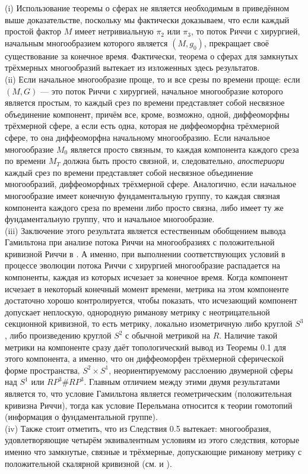 \begin{remark} (i) Использование теоремы о сферах не является необходимым в приведённом 
выше доказательстве, поскольку мы фактически доказываем, что если каждый простой фактор 
$M$ имеет нетривиальную $\pi_{2}$ или $\pi_{3}$, то поток Риччи с хирургией, начальным многообразием 
которого является $(M,g_{0})$, прекращает своё существование за конечное время. Фактически, 
теорема о сферах для замкнутых трёхмерных многообразий вытекает из изложенных здесь результатов.\\
(ii) Если начальное многообразие проще, то и все срезы по времени проще: если $(M,G)$ — это 
поток Риччи с хирургией, начальное многообразие которого является простым, то каждый срез 
по времени представляет собой несвязное объединение компонент, причём все, кроме, возможно, 
одной, диффеоморфны трёхмерной сфере, а если есть одна, которая не диффеоморфна трёхмерной 
сфере, то она диффеоморфна начальному многообразию. Если начальное многообразие $M_{0}$   
является просто связным, то каждая компонента каждого среза по времени $M_{T}$ должна быть 
просто связной, и, следовательно, \textit{апостериори} каждый срез по времени представляет собой 
несвязное объединение многообразий, диффеоморфных трёхмерной сфере. Аналогично, если 
начальное многообразие имеет конечную фундаментальную группу, то каждая связная компонента 
каждого среза по времени либо просто связна, либо имеет ту же фундаментальную группу, что 
и начальное многообразие.\\
(iii) Заключение этого результата является естественным обобщением вывода Гамильтона при 
анализе потока Риччи на многообразиях с положительной кривизной Риччи в \cite{c29}. А именно, 
при выполнении соответствующих условий в процессе эволюции потока Риччи с хирургией 
многообразие распадается на компоненты, каждая из которых исчезает за конечное время. 
Когда компонент исчезает в некоторый конечный момент времени, метрика на этом компоненте 
достаточно хорошо контролируется, чтобы показать, что исчезающий компонент допускает 
неплоскую, однородную риманову метрику с неотрицательной секционной кривизной, то есть 
метрику, локально изометричную либо круглой $S^{3}$, либо произведению круглой $S^{2}$ с обычной 
метрикой на $R$. Наличие такой метрики на компоненте сразу даёт топологический вывод из 
Теоремы 0.1 для этого компонента, а именно, что он диффеоморфен трёхмерной сферической 
форме пространства, $S^{2} \times S^{1}$, неориентируемому расслоению двумерной сферы над $S^{1}$ или 
$RP^{3}\# RP^{3}$. Главным отличием между этими двумя результатами является то, что условие 
Гамильтона является геометрическим (положительная кривизна Риччи), тогда как условие 
Перельмана относится к теории гомотопий (информация о фундаментальной группе).\\
(iv) Также стоит отметить, что из Следствия 0.5 вытекает: многообразия, удовлетворяющие 
четырём эквивалентным условиям из этого следствия, которые именно что замкнутые, связные и 
трёхмерные, допускающие риманову метрику с положительной скалярной 
кривизной (см. \cite{c62} и \cite{c26}).
\end{remark}

